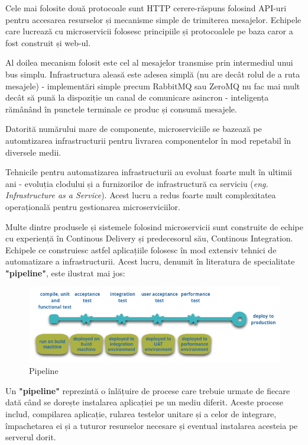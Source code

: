 \documentclass[12pt, a4paper, oneside, romanian]{teza-upb}
\begin{document}
Cele mai folosite două protocoale sunt HTTP cerere-răspuns folosind API-uri pentru accesarea resurselor și mecanisme simple de trimiterea mesajelor. Echipele care lucrează cu microservicii folosesc principiile și protocoalele pe baza caror a fost construit și web-ul. 

Al doilea mecanism folosit este cel al mesajelor transmise prin intermediul unui bus simplu. Infrastructura aleasă este adesea simplă (nu are decât rolul de a ruta mesajele) - implementări simple precum RabbitMQ sau ZeroMQ nu fac mai mult decât să pună la dispoziție un canal de comunicare asincron - inteligența rămânând în punctele terminale ce produc și consumă mesajele.

Datorită numărului mare de componente, microserviciile se bazează pe automtizarea infrastructurii pentru livrarea componentelor în mod repetabil în diversele medii. 

Tehnicile pentru automatizarea infrastructurii au evoluat foarte mult în ultimii ani - evoluția clodului și a furnizorilor de infrastructură ca serviciu (\textit{eng. Infrastructure as a Service}). Acest lucru a redus foarte mult complexitatea operațională pentru gestionarea microserviciilor. 

Multe dintre produsele și sistemele folosind microservicii sunt construite de echipe cu experiență în Continous Delivery și predecesorul său, Continous Integration. Echipele ce construiesc astfel aplicațiile folosesc în mod extensiv tehnici de automatizare a infrastructurii. Acest lucru, denumit în literatura de specialitate \textbf{"pipeline"}, este ilustrat mai jos:

\begin{figure}[ht]
\centering
\includegraphics[scale=0.6]{img/basic-pipeline.png}
\caption{Pipeline}
\label{fig:arhi_componente}
\end{figure}

Un \textbf{"pipeline"} reprezintă o înlățuire de procese care trebuie urmate de fiecare dată când se dorește instalarea aplicației pe un mediu diferit. Aceste procese includ, compilarea aplicație, rularea testelor unitare și a celor de integrare, împachetarea ei și a tuturor resurselor necesare și eventual instalarea acesteia pe serverul dorit.
\end{document}
